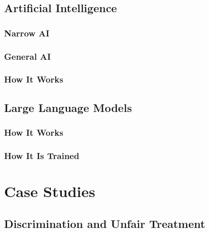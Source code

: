 \documentclass[
]{book}
\begin{document}
\hypertarget{artificial-intelligence}{%
\section{Artificial Intelligence}\label{artificial-intelligence}}

\hypertarget{narrow-ai}{%
\subsection{Narrow AI}\label{narrow-ai}}

\hypertarget{general-ai}{%
\subsection{General AI}\label{general-ai}}

\hypertarget{how-it-works}{%
\subsection{How It Works}\label{how-it-works}}

\hypertarget{large-language-models}{%
\section{Large Language Models}\label{large-language-models}}

\hypertarget{how-it-works-1}{%
\subsection{How It Works}\label{how-it-works-1}}

\hypertarget{how-it-is-trained}{%
\subsection{How It Is Trained}\label{how-it-is-trained}}

\hypertarget{case-studies}{%
\chapter{Case Studies}\label{case-studies}}

\hypertarget{discrimination-and-unfair-treatment}{%
\section{Discrimination and Unfair Treatment}\label{discrimination-and-unfair-treatment}}
\end{document}
